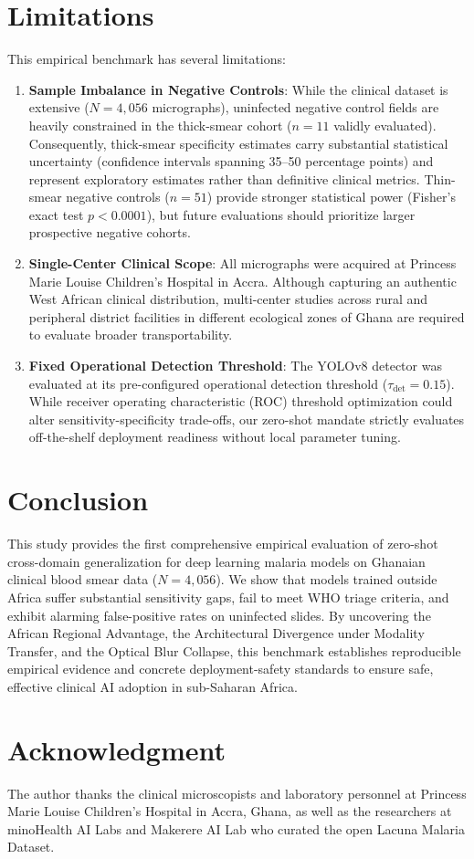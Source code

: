 \documentclass[10pt,journal,compsoc]{IEEEtran}
\begin{document}
\section{Limitations}
This empirical benchmark has several limitations:
\begin{enumerate}
    \item \textbf{Sample Imbalance in Negative Controls}: While the clinical dataset is extensive ($N = 4,056$ micrographs), uninfected negative control fields are heavily constrained in the thick-smear cohort ($n=11$ validly evaluated). Consequently, thick-smear specificity estimates carry substantial statistical uncertainty (confidence intervals spanning 35--50 percentage points) and represent exploratory estimates rather than definitive clinical metrics. Thin-smear negative controls ($n=51$) provide stronger statistical power (Fisher's exact test $p < 0.0001$), but future evaluations should prioritize larger prospective negative cohorts.
    \item \textbf{Single-Center Clinical Scope}: All micrographs were acquired at Princess Marie Louise Children's Hospital in Accra. Although capturing an authentic West African clinical distribution, multi-center studies across rural and peripheral district facilities in different ecological zones of Ghana are required to evaluate broader transportability.
    \item \textbf{Fixed Operational Detection Threshold}: The YOLOv8 detector was evaluated at its pre-configured operational detection threshold ($\tau_{\text{det}} = 0.15$). While receiver operating characteristic (ROC) threshold optimization could alter sensitivity-specificity trade-offs, our zero-shot mandate strictly evaluates off-the-shelf deployment readiness without local parameter tuning.
\end{enumerate}

\section{Conclusion}
This study provides the first comprehensive empirical evaluation of zero-shot cross-domain generalization for deep learning malaria models on Ghanaian clinical blood smear data ($N = 4,056$). We show that models trained outside Africa suffer substantial sensitivity gaps, fail to meet WHO triage criteria, and exhibit alarming false-positive rates on uninfected slides. By uncovering the African Regional Advantage, the Architectural Divergence under Modality Transfer, and the Optical Blur Collapse, this benchmark establishes reproducible empirical evidence and concrete deployment-safety standards to ensure safe, effective clinical AI adoption in sub-Saharan Africa.

\section*{Acknowledgment}
The author thanks the clinical microscopists and laboratory personnel at Princess Marie Louise Children's Hospital in Accra, Ghana, as well as the researchers at minoHealth AI Labs and Makerere AI Lab who curated the open Lacuna Malaria Dataset.



\end{document}
